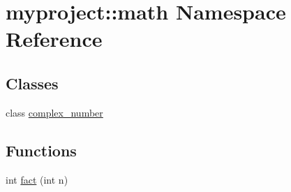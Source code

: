 \hypertarget{namespacemyproject_1_1math}{}\section{myproject\+:\+:math Namespace Reference}
\label{namespacemyproject_1_1math}
\subsection*{Classes}
\begin{DoxyCompactItemize}
\item 
class \hyperlink{classmyproject_1_1math_1_1complex__number}{complex\+\_\+number}
\end{DoxyCompactItemize}
\subsection*{Functions}
\begin{DoxyCompactItemize}
\item 
int \hyperlink{group__group__math_ga6068ca26852f38cc5dff403589631c1b}{fact} (int n)
\end{DoxyCompactItemize}
